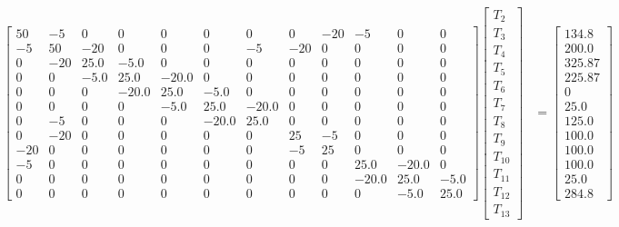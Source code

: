 \documentclass[10pt]{article}
\begin{document}
\begin{landscape}
{{\begin{align*}
\left[\begin{array}{cccccccccccc}50 & -5 & 0 & 0 & 0 & 0 & 0 & 0 & -20 & -5 & 0 & 0\\-5 & 50 & -20 & 0 & 0 & 0 & -5 & -20 & 0 & 0 & 0 & 0\\0 & -20 & 25.0 & -5.0 & 0 & 0 & 0 & 0 & 0 & 0 & 0 & 0\\0 & 0 & -5.0 & 25.0 & -20.0 & 0 & 0 & 0 & 0 & 0 & 0 & 0\\0 & 0 & 0 & -20.0 & 25.0 & -5.0 & 0 & 0 & 0 & 0 & 0 & 0\\0 & 0 & 0 & 0 & -5.0 & 25.0 & -20.0 & 0 & 0 & 0 & 0 & 0\\0 & -5 & 0 & 0 & 0 & -20.0 & 25.0 & 0 & 0 & 0 & 0 & 0\\0 & -20 & 0 & 0 & 0 & 0 & 0 & 25 & -5 & 0 & 0 & 0\\-20 & 0 & 0 & 0 & 0 & 0 & 0 & -5 & 25 & 0 & 0 & 0\\-5 & 0 & 0 & 0 & 0 & 0 & 0 & 0 & 0 & 25.0 & -20.0 & 0\\0 & 0 & 0 & 0 & 0 & 0 & 0 & 0 & 0 & -20.0 & 25.0 & -5.0\\0 & 0 & 0 & 0 & 0 & 0 & 0 & 0 & 0 & 0 & -5.0 & 25.0\end{array}\right]  \left[\begin{matrix}T_{2}\\T_{3}\\T_{4}\\T_{5}\\T_{6}\\T_{7}\\T_{8}\\T_{9}\\T_{10}\\T_{11}\\T_{12}\\T_{13}\end{matrix}\right]  &= \left[\begin{matrix}134.8\\200.0\\325.87\\225.87\\0\\25.0\\125.0\\100.0\\100.0\\100.0\\25.0\\284.8\end{matrix}\right]
\end{align*}
}}
\end{landscape}
\end{document}
